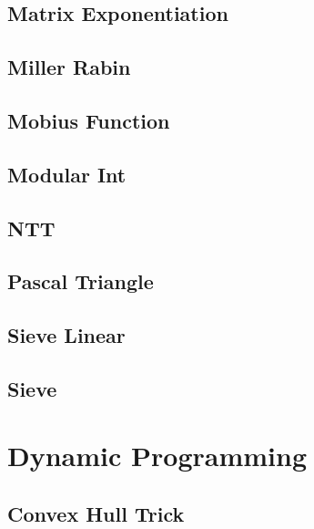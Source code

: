 \subsection{Matrix Exponentiation}
\raggedbottom
\hrulefill
\subsection{Miller Rabin}
\raggedbottom
\hrulefill
\subsection{Mobius Function}
\raggedbottom
\hrulefill
\subsection{Modular Int}
\raggedbottom
\hrulefill
\subsection{NTT}
\raggedbottom
\hrulefill
\subsection{Pascal Triangle}
\raggedbottom
\hrulefill
\subsection{Sieve Linear}
\raggedbottom
\hrulefill
\subsection{Sieve}
\raggedbottom
\hrulefill

\section{Dynamic Programming}
\subsection{Convex Hull Trick}
\raggedbottom
\hrulefill
